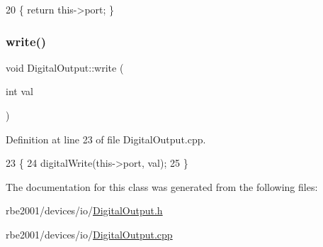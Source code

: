 \begin{DoxyCode}
20 \{ \textcolor{keywordflow}{return} this->port; \}
\end{DoxyCode}
\mbox{\label{class_digital_output_a6c2f1937df48d1ccb7f74f5e92a60943}} 
\subsubsection{\texorpdfstring{write()}{write()}}
{\footnotesize\ttfamily void Digital\+Output\+::write (\begin{DoxyParamCaption}\item[{int}]{val }\end{DoxyParamCaption})}



Definition at line 23 of file Digital\+Output.\+cpp.


\begin{DoxyCode}
23                                  \{
24     digitalWrite(this->port, val);
25 \}
\end{DoxyCode}


The documentation for this class was generated from the following files\+:\begin{DoxyCompactItemize}
\item 
rbe2001/devices/io/\hyperlink{_digital_output_8h}{Digital\+Output.\+h}\item 
rbe2001/devices/io/\hyperlink{_digital_output_8cpp}{Digital\+Output.\+cpp}\end{DoxyCompactItemize}
